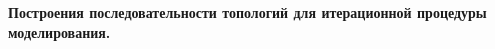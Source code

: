 

    

\textbf{Построения последовательности топологий для итерационной процедуры моделирования.}

